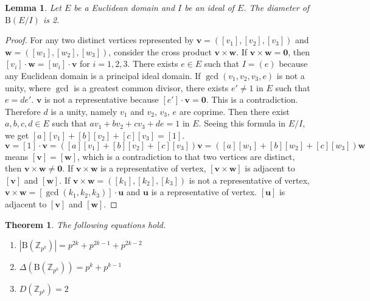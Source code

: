 \documentclass{article}
\newtheorem{Lem}{Lemma}
\newtheorem*{Th}{Theorem}
\newcommand{\Z}{\mathbb Z}
\newcommand{\B}{\mathrm{B}}
\begin{document}
\begin{Lem}\label{Lem:diameter}
Let $E$ be a Euclidean domain and $I$ be an ideal of $E$. The diameter of $\B(E/I)$ is 2.
\end{Lem}

\begin{proof}
For any two distinct vertices represented by $\bm v = ([v_1],[v_2],[v_3])$ and $\bm w=([w_1],[w_2],[w_3])$, consider the cross product $\bm v \times \bm w$. 
If $\bm v \times \bm w = \bm 0$, then $[v_i] \cdot \bm w = [w_i] \cdot \bm v$ for $i=1,2,3$. 
There exists $e \in E$ such that $I = (e)$ because any Euclidean domain is a principal ideal domain.
If $\gcd(v_1,v_2,v_3,e)$ is not a unity, where $\gcd$ is a greatest common divisor, 
there exists $e' \neq 1$ in $E$ such that $e=de'$. 
$\bm v$ is not a representative because $[e'] \cdot \bm v = \bm 0$. 
This is a contradiction. Therefore $d$ is a unity, namely $v_1$ and $v_2$, $v_3$, $e$ are coprime.
Then there exist $a, b, c, d \in E$ such that $ a v_1 + b v_2 + c v_3 + d e = 1$ in $E$.
Seeing this formula in $E/I$, we get $[a] [v_1] + [b] [v_2] + [c] [v_3] = [1]$.
\[ \bm v = [1] \cdot \bm v = ( [a] [v_1] + [b] [v_2] + [c] [v_3] ) \bm v = ( [a] [w_1] + [b] [w_2] + [c] [w_3] ) \bm w\]
means $[\bm v] = [\bm w]$, which is a contradiction to that two vertices are distinct, then $\bm v \times \bm w \neq \bm 0$. 
If $\bm v \times \bm w$ is a representative of vertex, $[\bm v \times \bm w]$ is adjacent to $[\bm v]$ and $[\bm w]$.
If $\bm v \times \bm w = ([k_1],[k_2],[k_3])$ is not a representative of vertex,
$\bm v \times \bm w = [\gcd(k_1,k_2,k_3)] \cdot \bm u$ and $\bm u$ is a representative of vertex. $[\bm u]$ is adjacent to $[\bm v]$ and $[\bm w]$.
\end{proof}

\begin{Th}\label{Th:main}
The following equations hold.
\begin{enumerate}
\item $ |\B(\Z_{p^k})| = p^{2k}+p^{2k-1}+p^{2k-2} $
\item $ \Delta(\B(\Z_{p^k})) = p^k + p^{k-1} $
\item $ D(\Z_{p^k}) = 2$
\end{enumerate}
\end{Th}
\end{document}
